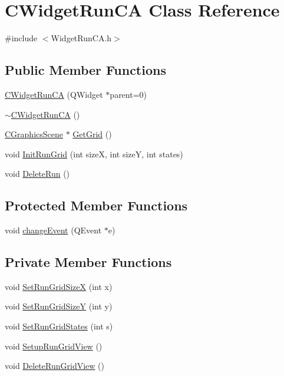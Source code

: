 \hypertarget{classCWidgetRunCA}{
\section{CWidgetRunCA Class Reference}
\label{classCWidgetRunCA}
}


{\ttfamily \#include $<$WidgetRunCA.h$>$}\subsection*{Public Member Functions}
\begin{DoxyCompactItemize}
\item 
\hyperlink{classCWidgetRunCA_a9caedb86747ca43e4fb25a47540dc913}{CWidgetRunCA} (QWidget $\ast$parent=0)
\item 
\hyperlink{classCWidgetRunCA_a1bce231d5077c8379aa7004ff09ca882}{$\sim$CWidgetRunCA} ()
\item 
\hyperlink{classCGraphicsScene}{CGraphicsScene} $\ast$ \hyperlink{classCWidgetRunCA_a3d5e7c81fb6ca9a403a7e09b095406f8}{GetGrid} ()
\item 
void \hyperlink{classCWidgetRunCA_a03a2ff0e531cc8308fdb26e0e2adca3f}{InitRunGrid} (int sizeX, int sizeY, int states)
\item 
void \hyperlink{classCWidgetRunCA_a4ad65849d43d161a9d9669c68e7a8a09}{DeleteRun} ()
\end{DoxyCompactItemize}
\subsection*{Protected Member Functions}
\begin{DoxyCompactItemize}
\item 
void \hyperlink{classCWidgetRunCA_aa4b0012b7945de59576888d37e880ef6}{changeEvent} (QEvent $\ast$e)
\end{DoxyCompactItemize}
\subsection*{Private Member Functions}
\begin{DoxyCompactItemize}
\item 
void \hyperlink{classCWidgetRunCA_a59cd2d794a0e8d4d284a7e685d679ee7}{SetRunGridSizeX} (int x)
\item 
void \hyperlink{classCWidgetRunCA_a401b881aeab0f689d08d9c94542b8716}{SetRunGridSizeY} (int y)
\item 
void \hyperlink{classCWidgetRunCA_ac59bae3e136a55bcf7c858b1dee2cadc}{SetRunGridStates} (int s)
\item 
void \hyperlink{classCWidgetRunCA_af91de52e2c23a56f5fc24b46cd8fd043}{SetupRunGridView} ()
\item 
void \hyperlink{classCWidgetRunCA_a60ba9306ab165cd11701226975f077da}{DeleteRunGridView} ()
\end{DoxyCompactItemize}

